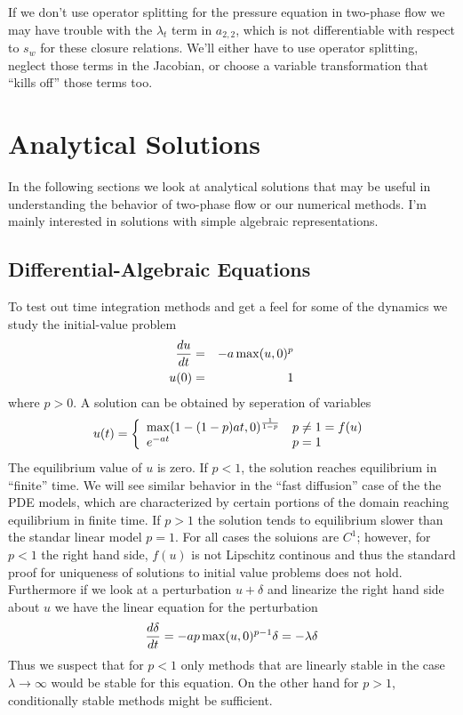 \documentclass[10pt,dvips,twoside,reqno]{amsart}
\begin{document}
If we don't use operator splitting for the pressure equation in
two-phase flow we may have trouble with the $\lambda_t$ term in
$a_{2,2}$, which is not differentiable with respect to $s_w$ for these
closure relations. We'll either have to use operator splitting,
neglect those terms in the Jacobian, or choose a variable
transformation that ``kills off'' those terms too.

\section{Analytical Solutions \label{analytical}}

In the following sections we look at analytical solutions that may be
useful in understanding the behavior of two-phase flow or our
numerical methods. I'm mainly interested in solutions with simple
algebraic representations.

\subsection{Differential-Algebraic Equations}

To test out time integration methods and get a feel for some of the
dynamics we study the initial-value problem
\begin{eqnarray}
\frac{d {u}}{d {t}} &=& - a \max(u,0)^p \\
u(0) &=& 1
\end{eqnarray}
where $p > 0$. A solution can be obtained by seperation of variables
\begin{equation}
u(t) = \left\{ \begin{array}{ll} \max(1 - (1-p) a t,0)^{\frac{1}{1-p}} & p \neq 1 = f(u) \\
e^{-a t} & p = 1 \end{array} \right.
\end{equation}
The equilibrium value of $u$ is zero. If $p<1$, the solution reaches
equilibrium in ``finite'' time. We will see similar behavior in the
``fast diffusion'' case of the the PDE models, which are characterized
by certain portions of the domain reaching equilibrium in finite time.
If $p > 1$ the solution tends to equilibrium slower than the standar
linear model $p=1$.  For all cases the soluions are $C^1$; however,
for $p<1$ the right hand side, $f(u)$ is not Lipschitz continous and
thus the standard proof for uniqueness of solutions to initial value
problems does not hold. Furthermore if we look at a perturbation $u +
\delta$ and linearize the right hand side about $u$ we have the linear
equation for the perturbation
\begin{equation}
\frac{d {\delta}}{d {t}} = - a p \max(u,0)^{p-1} \delta = - \lambda \delta
\end{equation}
Thus we suspect that for $p<1$ only methods that are linearly stable
in the case $\lambda \rightarrow \infty$ would be stable for this
equation. On the other hand for $p > 1$, conditionally stable methods
might be sufficient.
\end{document}
